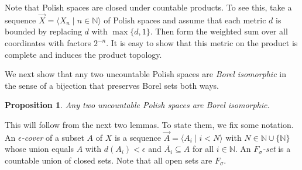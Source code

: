 \documentclass[10pt]{amsart}
\newcommand{\RR}{\mathbb{R}}
\newcommand{\NN}{\mathbb{N}}
\newtheorem{proposition}[theorem]{Proposition}
\theoremstyle{definition}
\newtheorem{definition}[theorem]{Definition}
\theoremstyle{remark}
\newenvironment{enumerate-(a)}{\begin{enumerate}[label={\upshape (\alph*)}, leftmargin=2pc]}{\end{enumerate}}
\begin{document}
\bigskip 
Note that Polish spaces are closed under countable products. 
To see this, take  a sequence $\vec{X}=\langle X_n\mid n\in\NN\rangle$ of Polish spaces and assume that each metric $d$ is bounded by replacing $d$ with $\max\{d,1\}$. 
Then form the weighted sum over all coordinates with factors $2^{-n}$. 
It is easy to show that this metric on the product is complete and induces the product topology. 

\bigskip 
We next show that any two uncountable Polish spaces are \emph{Borel isomorphic} in the sense of a bijection that preserves Borel sets both ways. 


\begin{proposition} \label{Borel isomorphism of Polish spaces} 
Any two uncountable Polish spaces are Borel isomorphic. 
\end{proposition} 

This will follow from the next two lemmas. 
To state them, we fix some notation. 
An \emph{$\epsilon$-cover} of a subset $A$ of $X$ is a sequence $\vec{A}=\langle A_i\mid i<N\rangle$ with $N\in \NN\cup\{\NN\}$ whose union equals $A$ with $d(A_i)<\epsilon$ and $\overline{A_i}\subseteq A$ for all $i\in\NN$. 
An \emph{$F_\sigma$-set} is a countable union of closed sets. 
Note that all open sets are $F_\sigma$. 
\end{document}
